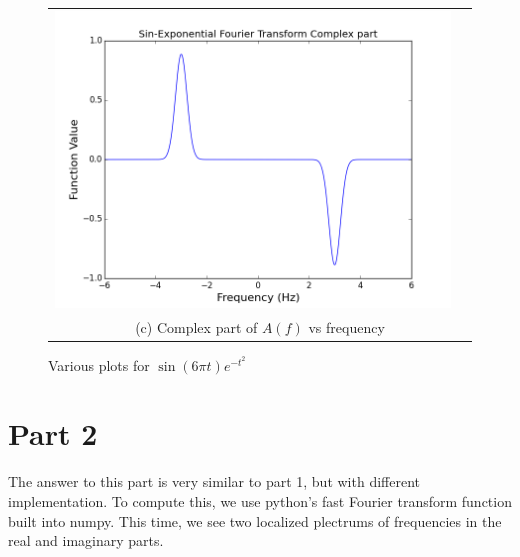 \documentclass[11pt]{article}
\begin{document}
\begin{figure}[ht]
\begin{tabular}{cc}
\includegraphics[scale=.4]{sin_fourComp.png}\\
\multicolumn{2}{c}{(c) Complex part of $A(f)$ vs frequency} \\[6pt]
\end{tabular}
\caption{Various plots for $\sin (6\pi t) e^{-t^2} $}
\end{figure}


\section{Part 2}

The answer to this part is very similar to part 1, but with different implementation. To compute this, we use python's fast Fourier transform function built into numpy. This time, we see two localized plectrums of frequencies in the real and imaginary parts. 
\end{document}
